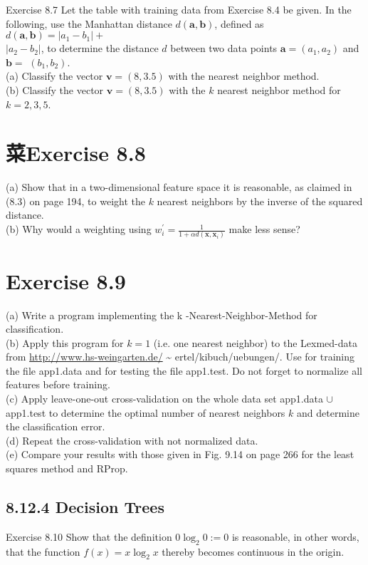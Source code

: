 \documentclass[10pt]{article}
\begin{document}
Exercise 8.7 Let the table with training data from Exercise 8.4 be given. In the following, use the Manhattan distance $d(\boldsymbol{a}, \boldsymbol{b})$, defined as $d(\boldsymbol{a}, \boldsymbol{b})=\left|a_{1}-b_{1}\right|+$\\
$\left|a_{2}-b_{2}\right|$, to determine the distance $d$ between two data points $\boldsymbol{a}=\left(a_{1}, a_{2}\right)$ and $\boldsymbol{b}=$ $\left(b_{1}, b_{2}\right)$.\\
(a) Classify the vector $\boldsymbol{v}=(8,3.5)$ with the nearest neighbor method.\\
(b) Classify the vector $\boldsymbol{v}=(8,3.5)$ with the $k$ nearest neighbor method for $k=2,3,5$.

\section*{菜Exercise 8.8}
(a) Show that in a two-dimensional feature space it is reasonable, as claimed in (8.3) on page 194, to weight the $k$ nearest neighbors by the inverse of the squared distance.\\
(b) Why would a weighting using $w_{i}^{\prime}=\frac{1}{1+\alpha d\left(\boldsymbol{x}, \boldsymbol{x}_{i}\right)}$ make less sense?

\section*{Exercise 8.9}
(a) Write a program implementing the k -Nearest-Neighbor-Method for classification.\\
(b) Apply this program for $k=1$ (i.e. one nearest neighbor) to the Lexmed-data from \href{http://www.hs-weingarten.de/}{http://www.hs-weingarten.de/} \~{} ertel/kibuch/uebungen/. Use for training the file app1.data and for testing the file app1.test. Do not forget to normalize all features before training.\\
(c) Apply leave-one-out cross-validation on the whole data set app1.data $\cup$ app1.test to determine the optimal number of nearest neighbors $k$ and determine the classification error.\\
(d) Repeat the cross-validation with not normalized data.\\
(e) Compare your results with those given in Fig. 9.14 on page 266 for the least squares method and RProp.

\subsection*{8.12.4 Decision Trees}
Exercise 8.10 Show that the definition $0 \log _{2} 0:=0$ is reasonable, in other words, that the function $f(x)=x \log _{2} x$ thereby becomes continuous in the origin.
\end{document}
